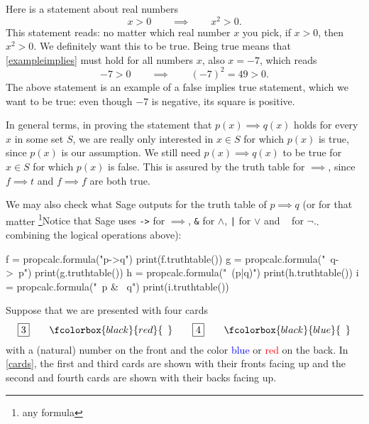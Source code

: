 \documentclass{article}
\begin{document}
\begin{frameit}
  \begin{remark}
    Here is a statement about real numbers
    \begin{equation}\label{exampleimplies}
    x > 0 \qquad \implies \qquad x^2 > 0.
    \end{equation}
    This statement reads: no matter which real number $x$ you pick, if $x > 0$,
    then $x^2 > 0$. We definitely want this to be true. Being true means
    that \eqref{exampleimplies} must hold for all numbers $x$, also $x = -7$,
    which reads
    $$
    - 7 > 0 \qquad \implies \qquad (-7)^2 = 49 > 0.
    $$
    The above statement is an example of a false implies true statement, which
    we want to be true: even though $-7$ is negative, its square is positive.

    In general terms, in proving the statement that $p(x) \implies q(x)$ holds for every $x$ in
    some set $S$, we are really only interested in $x\in S$ for which $p(x)$ is true, since
    $p(x)$ is our assumption. We still need $p(x)\implies q(x)$ to be true for $x\in S$ for
    which $p(x)$ is false. This is assured by the truth table for $\implies$, since 
    $f \implies t$ and $f\implies f$ are both true.
  \end{remark}
\end{frameit}


We may also check what Sage outputs for the truth table of $p\implies q$ (or for that
matter \footnote{any formula}{Notice that Sage uses \texttt{->} for $\implies$, \texttt{\&} for $\land$, \texttt{|} for $\lor$ and \texttt{~} for $\neg$.}.
 combining the logical operations above):

\begin{sage}
f = propcalc.formula("p->q")
print(f.truthtable())
g = propcalc.formula("~q->~p")
print(g.truthtable())
h = propcalc.formula("~(p|q)")
print(h.truthtable())
i = propcalc.formula("~p & ~q")
print(i.truthtable())
\end{sage}

  



\beginshex\label{excolorcards}
Suppose that we are presented with four cards
\begin{equation}\label{cards}
\boxed{3}\qquad \fcolorbox{black}{red}{\phantom{3}}
\qquad\boxed{4}\qquad \fcolorbox{black}{blue}{\phantom{4}}
\end{equation}
with a (natural) number on the front and the color
\textcolor{blue}{blue} or \textcolor{red}{red} on the back.
In \eqref{cards}, the first and third cards are shown with their fronts facing up and
the second and fourth cards are shown with their backs facing up.
\end{document}
